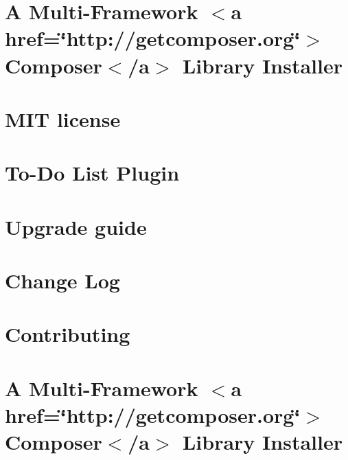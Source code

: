 \let\mypdfximage\pdfximage\def\pdfximage{\immediate\mypdfximage}\documentclass[twoside]{book}
\newcommand{\+}{\discretionary{\mbox{\scriptsize$\hookleftarrow$}}{}{}}
\begin{document}
\chapter{A Multi-\/\+Framework $<$a href=\char`\"{}http\+://getcomposer.\+org\char`\"{}$>$Composer$<$/a$>$ Library Installer}
\label{md_rainlab_user_vendor_composer_installers__r_e_a_d_m_e}

\chapter{MIT license}
\label{md_renatio_todos__l_i_c_e_n_c_e}

\chapter{To-\/\+Do List Plugin}
\label{md_renatio_todos__r_e_a_d_m_e}

\chapter{Upgrade guide}
\label{md_renatio_todos__u_p_g_r_a_d_e}

\chapter{Change Log}
\label{md_renatio_todos_vendor_composer_installers__c_h_a_n_g_e_l_o_g}

\chapter{Contributing}
\label{md_renatio_todos_vendor_composer_installers__c_o_n_t_r_i_b_u_t_i_n_g}

\chapter{A Multi-\/\+Framework $<$a href=\char`\"{}http\+://getcomposer.\+org\char`\"{}$>$Composer$<$/a$>$ Library Installer}
\label{md_renatio_todos_vendor_composer_installers__r_e_a_d_m_e}

\end{document}

